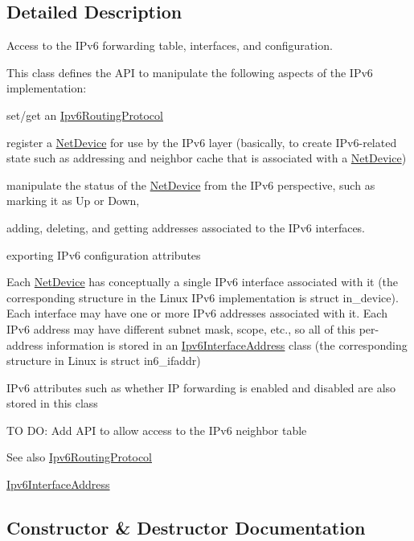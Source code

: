 \subsection{Detailed Description}
Access to the I\+Pv6 forwarding table, interfaces, and configuration. 

This class defines the A\+PI to manipulate the following aspects of the I\+Pv6 implementation\+:
\begin{DoxyEnumerate}
\item set/get an \hyperlink{classns3_1_1Ipv6RoutingProtocol}{Ipv6\+Routing\+Protocol}
\item register a \hyperlink{classns3_1_1NetDevice}{Net\+Device} for use by the I\+Pv6 layer (basically, to create I\+Pv6-\/related state such as addressing and neighbor cache that is associated with a \hyperlink{classns3_1_1NetDevice}{Net\+Device})
\item manipulate the status of the \hyperlink{classns3_1_1NetDevice}{Net\+Device} from the I\+Pv6 perspective, such as marking it as Up or Down,
\item adding, deleting, and getting addresses associated to the I\+Pv6 interfaces.
\item exporting I\+Pv6 configuration attributes
\end{DoxyEnumerate}

Each \hyperlink{classns3_1_1NetDevice}{Net\+Device} has conceptually a single I\+Pv6 interface associated with it (the corresponding structure in the Linux I\+Pv6 implementation is struct in\+\_\+device). Each interface may have one or more I\+Pv6 addresses associated with it. Each I\+Pv6 address may have different subnet mask, scope, etc., so all of this per-\/address information is stored in an \hyperlink{classns3_1_1Ipv6InterfaceAddress}{Ipv6\+Interface\+Address} class (the corresponding structure in Linux is struct in6\+\_\+ifaddr)

I\+Pv6 attributes such as whether IP forwarding is enabled and disabled are also stored in this class

TO DO\+: Add A\+PI to allow access to the I\+Pv6 neighbor table

\begin{DoxySeeAlso}{See also}
\hyperlink{classns3_1_1Ipv6RoutingProtocol}{Ipv6\+Routing\+Protocol} 

\hyperlink{classns3_1_1Ipv6InterfaceAddress}{Ipv6\+Interface\+Address} 
\end{DoxySeeAlso}


\subsection{Constructor \& Destructor Documentation}
